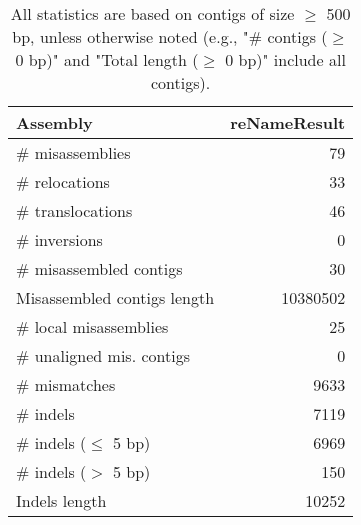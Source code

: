 \documentclass[12pt,a4paper]{article}
\begin{document}
\begin{table}[ht]
\begin{center}
\caption{All statistics are based on contigs of size $\geq$ 500 bp, unless otherwise noted (e.g., "\# contigs ($\geq$ 0 bp)" and "Total length ($\geq$ 0 bp)" include all contigs).}
\begin{tabular}{|l*{1}{|r}|}
\hline
Assembly & reNameResult \\ \hline
\# misassemblies & 79 \\ \hline
\hspace{5mm}\# relocations & 33 \\ \hline
\hspace{5mm}\# translocations & 46 \\ \hline
\hspace{5mm}\# inversions & 0 \\ \hline
\# misassembled contigs & 30 \\ \hline
Misassembled contigs length & 10380502 \\ \hline
\# local misassemblies & 25 \\ \hline
\# unaligned mis. contigs & 0 \\ \hline
\# mismatches & 9633 \\ \hline
\# indels & 7119 \\ \hline
\hspace{5mm}\# indels ($\leq$ 5 bp) & 6969 \\ \hline
\hspace{5mm}\# indels ($>$ 5 bp) & 150 \\ \hline
Indels length & 10252 \\ \hline
\end{tabular}
\end{center}
\end{table}
\end{document}
